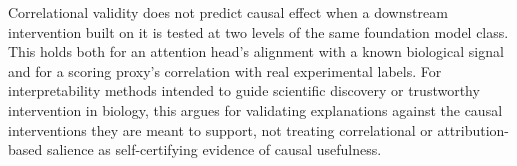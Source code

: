 \documentclass{article}
\begin{document}
Correlational validity does not predict causal effect when a downstream
intervention built on it is tested at two levels of the same foundation
model class. This holds both for an attention head's alignment with a
known biological signal and for a scoring proxy's correlation with real
experimental labels. For interpretability methods intended to
guide scientific discovery or trustworthy intervention in biology, this
argues for validating explanations against the causal interventions they
are meant to support, not treating correlational or attribution-based
salience as self-certifying evidence of causal usefulness.



\end{document}
